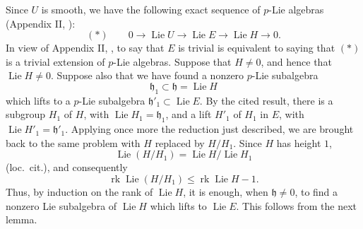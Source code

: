 Since \(U\) is smooth, we have the following exact sequence of
\(p\)-Lie algebras (Appendix II, ):
\[
  (*)\qquad
  0\longrightarrow\operatorname{Lie}U
   \longrightarrow\operatorname{Lie}E
   \longrightarrow\operatorname{Lie}H
   \longrightarrow0.
\]
In view of Appendix II, , to say that \(E\) is trivial is
equivalent to saying that \((*)\) is a trivial extension of
\(p\)-Lie algebras.  Suppose that \(H\ne0\), and hence that
\(\operatorname{Lie}H\ne0\).  Suppose also that we have found a
nonzero \(p\)-Lie subalgebra
\[
  \mathfrak h_1\subset\mathfrak h=\operatorname{Lie}H
\]
which lifts to a \(p\)-Lie subalgebra
\(\mathfrak h'_1\subset\operatorname{Lie}E\).  By the cited result,
there is a subgroup \(H_1\) of \(H\), with
\(\operatorname{Lie}H_1=\mathfrak h_1\), and a lift \(H'_1\) of
\(H_1\) in \(E\), with
\(\operatorname{Lie}H'_1=\mathfrak h'_1\).  Applying once more the
reduction just described, we are brought back to the same problem
with \(H\) replaced by \(H/H_1\).  Since \(H\) has height \(1\),
\[
  \operatorname{Lie}(H/H_1)
   =\operatorname{Lie}H/\operatorname{Lie}H_1
\]
(loc.\ cit.), and consequently
\[
  \operatorname{rk}\operatorname{Lie}(H/H_1)
  \leq \operatorname{rk}\operatorname{Lie}H-1.
\]
Thus, by induction on the rank of \(\operatorname{Lie}H\), it is
enough, when \(\mathfrak h\ne0\), to find a nonzero Lie subalgebra
of \(\operatorname{Lie}H\) which lifts to \(\operatorname{Lie}E\).
This follows from the next lemma.


